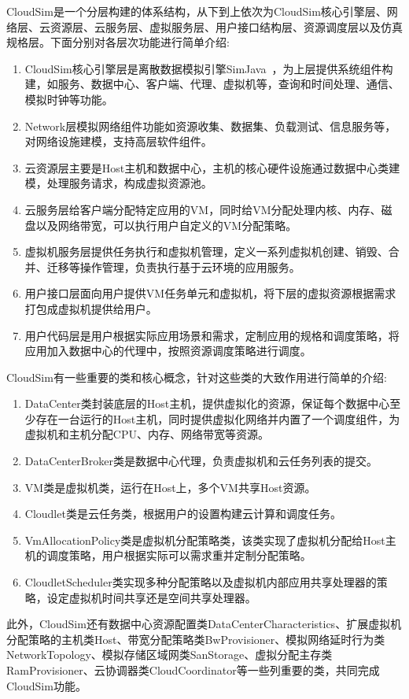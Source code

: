 CloudSim是一个分层构建的体系结构，从下到上依次为CloudSim核心引擎层、网络层、云资源层、云服务层、虚拟服务层、用户接口结构层、资源调度层以及仿真规格层。下面分别对各层次功能进行简单介绍:
\begin{enumerate}[(1).]
	\item CloudSim核心引擎层是离散数据模拟引擎SimJava~\cite{SimJava1998}，为上层提供系统组件构建，如服务、数据中心、客户端、代理、虚拟机等，查询和时间处理、通信、模拟时钟等功能。
	\item Network层模拟网络组件功能如资源收集、数据集、负载测试、信息服务等，对网络设施建模，支持高层软件组件。
	\item 云资源层主要是Host主机和数据中心，主机的核心硬件设施通过数据中心类建模，处理服务请求，构成虚拟资源池。
	\item 云服务层给客户端分配特定应用的VM，同时给VM分配处理内核、内存、磁盘以及网络带宽，可以执行用户自定义的VM分配策略。
	\item 虚拟机服务层提供任务执行和虚拟机管理，定义一系列虚拟机创建、销毁、合并、迁移等操作管理，负责执行基于云环境的应用服务。
	\item 用户接口层面向用户提供VM任务单元和虚拟机，将下层的虚拟资源根据需求打包成虚拟机提供给用户。
	\item 用户代码层是用户根据实际应用场景和需求，定制应用的规格和调度策略，将应用加入数据中心的代理中，按照资源调度策略进行调度。
\end{enumerate}
CloudSim有一些重要的类和核心概念，针对这些类的大致作用进行简单的介绍:
\begin{enumerate}[1.]
	\item DataCenter类封装底层的Host主机，提供虚拟化的资源，保证每个数据中心至少存在一台运行的Host主机，同时提供虚拟化网络并内置了一个调度组件，为虚拟机和主机分配CPU、内存、网络带宽等资源。
	\item DataCenterBroker类是数据中心代理，负责虚拟机和云任务列表的提交。
	\item VM类是虚拟机类，运行在Host上，多个VM共享Host资源。
	\item Cloudlet类是云任务类，根据用户的设置构建云计算和调度任务。
	\item VmAllocationPolicy类是虚拟机分配策略类，该类实现了虚拟机分配给Host主机的调度策略，用户根据实际可以需求重并定制分配策略。
	\item CloudletScheduler类实现多种分配策略以及虚拟机内部应用共享处理器的策略，设定虚拟机时间共享还是空间共享处理器。
\end{enumerate}

此外，CloudSim还有数据中心资源配置类DataCenterCharacteristics、扩展虚拟机分配策略的主机类Host、带宽分配策略类BwProvisioner、模拟网络延时行为类NetworkTopology、模拟存储区域网类SanStorage、虚拟分配主存类RamProvisioner、云协调器类CloudCoordinator等一些列重要的类，共同完成CloudSim功能。

